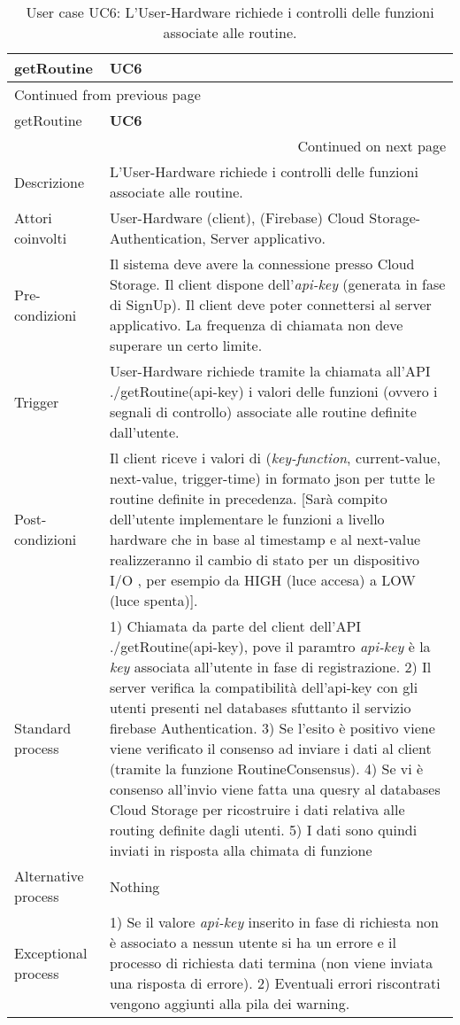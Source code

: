 \documentclass[onecolumn,a4paper]{article}
\begin{document}
\begin{longtable}{|l|p{9.7cm}|}
\caption{User case UC6: L'User-Hardware richiede i controlli delle funzioni associate alle routine.}
\\
\cellcolor{grey!15}getRoutine & \cellcolor{grey!15} \textbf{UC6}\\
\hline
\endfirsthead
\multicolumn{2}{l}{Continued from previous page} \\
\hline

\cellcolor{grey!15}getRoutine & \cellcolor{grey!15} \textbf{UC6} \\

\hline
\endhead
\hline\multicolumn{2}{r}{Continued on next page} \\
\endfoot
\endlastfoot
\hline
Descrizione & L'User-Hardware richiede i controlli delle funzioni associate alle routine.\\
\hline
Attori coinvolti & User-Hardware (client), (Firebase) Cloud Storage-Authentication, Server applicativo.\\
\hline
Pre-condizioni & Il sistema deve avere la connessione presso Cloud Storage. Il client dispone dell'\emph{api-key} (generata in fase di SignUp). Il client deve poter connettersi al server applicativo. La frequenza di  chiamata non deve superare un certo limite.\\
\hline
Trigger & User-Hardware richiede tramite la chiamata all'API ./getRoutine(api-key) i valori delle funzioni (ovvero i segnali di controllo) associate alle routine definite dall'utente.\\
\hline
Post-condizioni & Il client riceve i valori di (\emph{key-function}, current-value, next-value, trigger-time) in formato json per tutte le routine definite in precedenza. [Sarà compito dell'utente implementare le funzioni a livello hardware che in base al timestamp e al next-value realizzeranno il cambio di stato per un dispositivo I/O , per esempio da HIGH (luce accesa) a LOW (luce spenta)].\\
\hline
Standard process & 1) Chiamata da parte del client dell'API ./getRoutine(api-key), pove il paramtro \emph{api-key} è la \emph{key} associata all'utente in fase di registrazione. 2) Il server verifica la compatibilità dell'api-key con gli utenti presenti nel databases sfuttanto il servizio firebase Authentication. 3) Se l'esito è positivo viene viene verificato il consenso ad inviare i dati al client (tramite la funzione RoutineConsensus). 4) Se vi è consenso all'invio viene fatta una quesry al databases Cloud Storage per ricostruire i dati relativa alle routing definite dagli utenti. 5) I dati sono quindi inviati in risposta alla chimata di funzione\\
\hline
Alternative process & Nothing\\
\hline
Exceptional process & 1) Se il valore \emph{api-key} inserito in fase di richiesta non è associato a nessun utente si ha un errore e il processo di richiesta dati termina (non viene inviata una risposta di errore). 2) Eventuali errori riscontrati vengono aggiunti alla pila dei warning.\\
\hline
\end{longtable}
\end{document}
